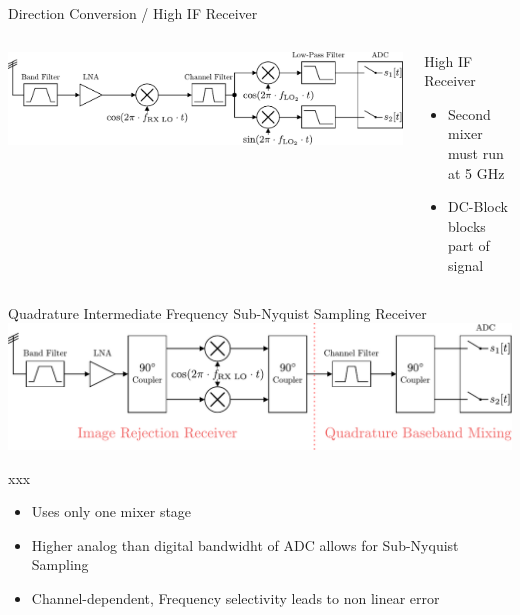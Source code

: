 \documentclass{beamer}
\begin{document}
\begin{frame}{Direction Conversion / High IF Receiver}
{\begin{columns}[T]
\begin{column}{.5\textwidth}
      \end{column}
    \end{columns}
    \vspace{11ex}
  }
  \begin{columns}[T]
    \begin{column}{.6\textwidth}
      \includegraphics[width=\textwidth]{figures/rx_0_bd}
    \end{column}
    \begin{column}{.4\textwidth}
      \begin{block}{High IF Receiver}
        \begin{itemize}
        \item Second mixer must run at 5 GHz
        \item DC-Block blocks part of signal
        \end{itemize}
      \end{block}
    \end{column}
  \end{columns}
\end{frame}


\begin{frame}{Quadrature Intermediate Frequency Sub-Nyquist Sampling Receiver}
  \includegraphics[width=\textwidth]{figures/rx_3_bd} \\

  \begin{block}{xxx}
    \begin{itemize}
    \item Uses only one mixer stage
    \item Higher analog than digital bandwidht of ADC allows for Sub-Nyquist Sampling
    \item Channel-dependent, Frequency selectivity leads to non linear error
    \end{itemize}
  \end{block}
\end{frame}
\end{document}
